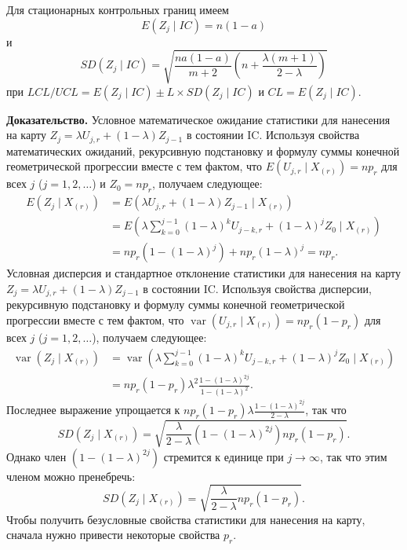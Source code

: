 Для стационарных контрольных границ имеем
\[
	E(Z_j \mid IC) = n(1 - a)
\]
и
\[
	SD(Z_j \mid IC) = \sqrt{\frac{na(1 - a)}{m + 2}\left( n + \frac{\lambda(m + 1)}{2 - \lambda} \right)}
\]
при \(LCL/UCL = E(Z_j \mid IC) \pm L \times SD(Z_j \mid IC)\) и \(CL = E(Z_j \mid IC)\).

\noindent\textbf{Доказательство.} Условное математическое ожидание статистики для нанесения на карту \(Z_j = \lambda U_{j,r} + (1 - \lambda)Z_{j-1}\) в состоянии IC. Используя свойства математических ожиданий, рекурсивную подстановку и формулу суммы конечной геометрической прогрессии вместе с тем фактом, что \(E\left( U_{j,r} \mid X_{(r)} \right) = np_r\) для всех \(j\) (\(j = 1, 2, \ldots\)) и \(Z_0 = np_r\), получаем следующее:
\begin{align*}
	E\left( Z_j \mid X_{(r)} \right) &= E\left( \lambda U_{j,r} + (1 - \lambda)Z_{j-1} \mid X_{(r)} \right) \\
	&= E\left( \lambda\sum_{k=0}^{j-1}(1 - \lambda)^k U_{j-k,r} + (1 - \lambda)^j Z_0 \mid X_{(r)} \right) \\
	&= np_r\left( 1 - (1 - \lambda)^j \right) + np_r(1 - \lambda)^j = np_r.
\end{align*}
Условная дисперсия и стандартное отклонение статистики для нанесения на карту \(Z_j = \lambda U_{j,r} + (1 - \lambda)Z_{j-1}\) в состоянии IC. Используя свойства дисперсии, рекурсивную подстановку и формулу суммы конечной геометрической прогрессии вместе с тем фактом, что \(\operatorname{var}\left( U_{j,r} \mid X_{(r)} \right) = np_r(1 - p_r)\) для всех \(j\) (\(j = 1, 2, \ldots\)), получаем следующее:
\begin{align*}
	\operatorname{var}\left( Z_j \mid X_{(r)} \right) &= \operatorname{var}\left( \lambda\sum_{k=0}^{j-1}(1 - \lambda)^k U_{j-k,r} + (1 - \lambda)^j Z_0 \mid X_{(r)} \right) \\
	&= np_r(1 - p_r)\lambda^2\frac{1 - (1 - \lambda)^{2j}}{1 - (1 - \lambda)^2}.
\end{align*}
Последнее выражение упрощается к \(np_r(1 - p_r)\lambda\frac{1 - (1 - \lambda)^{2j}}{2 - \lambda}\), так что
\[
	SD\left( Z_j \mid X_{(r)} \right) = \sqrt{\frac{\lambda}{2 - \lambda}\left( 1 - (1 - \lambda)^{2j} \right)np_r(1 - p_r)}.
\]
Однако член \(\left( 1 - (1 - \lambda)^{2j} \right)\) стремится к единице при \(j \to \infty\), так что этим членом можно пренебречь:
\[
	SD\left( Z_j \mid X_{(r)} \right) = \sqrt{\frac{\lambda}{2 - \lambda}np_r(1 - p_r)}.
\]
Чтобы получить безусловные свойства статистики для нанесения на карту, сначала нужно привести некоторые свойства \(p_r\).

